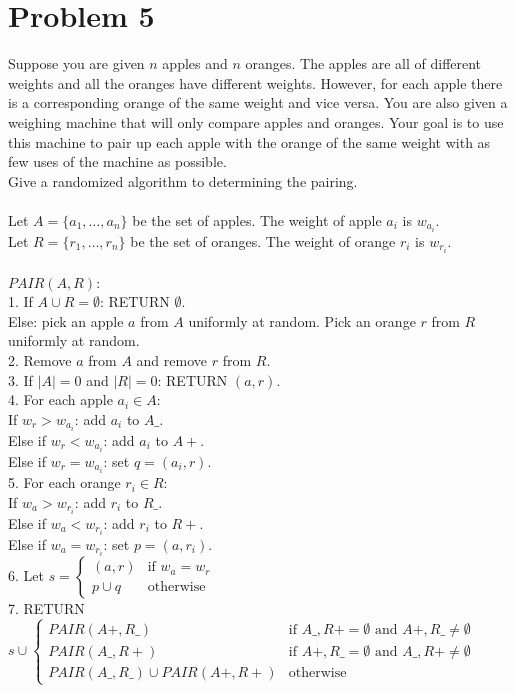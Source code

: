 \documentclass[10pt,letterpaper]{article}
\newcommand\tab[1][0.5cm]{\hspace*{#1}}
\begin{document}
\section{Problem 5}
Suppose you are given $n$ apples and $n$ oranges. The apples are all of different weights and all the oranges have different weights. However, for each apple there is a corresponding orange of the same weight and vice versa. You are also given a weighing machine that will only compare apples and oranges. Your goal is to use this machine to pair up each apple with the orange of the same weight with as few uses of the machine as possible.\\
Give a randomized algorithm to determining the pairing.\\\\
Let $A = \{a_1,\dots,a_n\}$ be the set of apples. The weight of apple $a_i$ is $w_{a_i}$.\\
Let $R = \{r_1,\dots,r_n\}$ be the set of oranges. The weight of orange $r_i$ is $w_{r_i}$.\\\\
$PAIR(A,R)$:\\
1. If $A \cup R = \emptyset$: RETURN $\emptyset$.\\
Else: pick an apple $a$ from $A$ uniformly at random. Pick an orange $r$ from $R$ uniformly at random.\\
2. Remove $a$ from $A$ and remove $r$ from $R$.\\
3. If $|A|=0$ and $|R|=0$: RETURN $(a,r)$.\\
4. For each apple $a_i \in A$:\\
\tab If $w_{r} > w_{a_i}$: add $a_i$ to $A\_$.\\
\tab Else if $w_{r} < w_{a_i}$: add $a_i$ to $A+$.\\
\tab Else if $w_{r} = w_{a_i}$: set $q = (a_i,r)$.\\
5. For each orange $r_i \in R$:\\
\tab If $w_{a} > w_{r_i}$: add $r_i$ to $R\_$.\\
\tab Else if $w_{a} < w_{r_i}$: add $r_i$ to $R+$.\\
\tab Else if $w_{a} = w_{r_i}$: set $p = (a,r_i)$.\\
6. Let $s =
\begin{cases}
(a,r) & \text{if } w_a = w_r \\
p \cup q & \text{otherwise}
\end{cases}$\\
7. RETURN $s \cup 
\begin{cases}
PAIR(A+,R\_) & \text{if $A\_,R+=\emptyset$ and $A+,R\_ \neq \emptyset$} \\
PAIR(A\_,R+) & \text{if $A+,R\_=\emptyset$ and $A\_,R+ \neq \emptyset$} \\
PAIR(A\_,R\_) \cup PAIR(A+,R+) & \text{otherwise}
\end{cases}$
\end{document}
